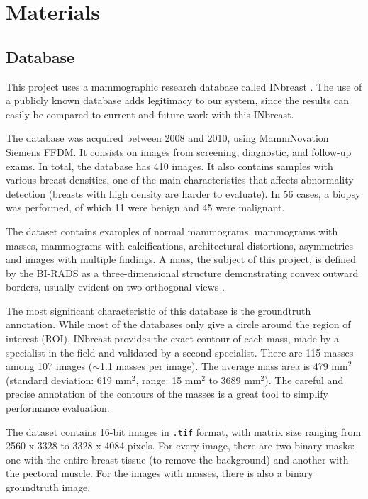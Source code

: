 \section{Materials}
\label{sec:materials}
\subsection{Database}
This project uses a mammographic research database called INbreast \cite{Moreira2012}. The use of a publicly known database adds legitimacy to our system, since the results can easily be compared to current and future work with this INbreast.\par
The database was acquired between 2008 and 2010, using MammNovation Siemens FFDM. It consists on images from screening, diagnostic, and follow-up exams. In total, the database has 410 images. It also contains samples with various breast densities, one of the main characteristics that affects abnormality detection (breasts with high density are harder to evaluate). In 56 cases, a biopsy was performed, of which 11 were benign and 45 were malignant.\par
The dataset contains examples of normal mammograms, mammograms with masses, mammograms with calcifications, architectural distortions, asymmetries and images with multiple findings. A mass, the subject of this project, is defined by the BI-RADS as a three-dimensional structure demonstrating convex outward borders, usually evident on two orthogonal views \cite{Sickles2013}.\par
The most significant characteristic of this database is the groundtruth annotation. While most of the databases only give a circle around the region of interest (ROI), INbreast provides the exact contour of each mass, made by a specialist in the field and validated by a second specialist. There are 115 masses among 107 images ($\sim$1.1 masses per image). The average mass area is 479 mm$^2$ (standard deviation: 619 mm$^2$, range: 15 mm$^2$ to 3689 mm$^2$). The careful and precise annotation of the contours of the masses is a great tool to simplify performance evaluation. \par
The dataset contains 16-bit images in \texttt{.tif} format, with matrix size ranging from 2560 x 3328 to 3328 x 4084 pixels. For every image, there are two binary masks: one with the entire breast tissue (to remove the background) and another with the pectoral muscle. For the images with masses, there is also a binary groundtruth image.\par
